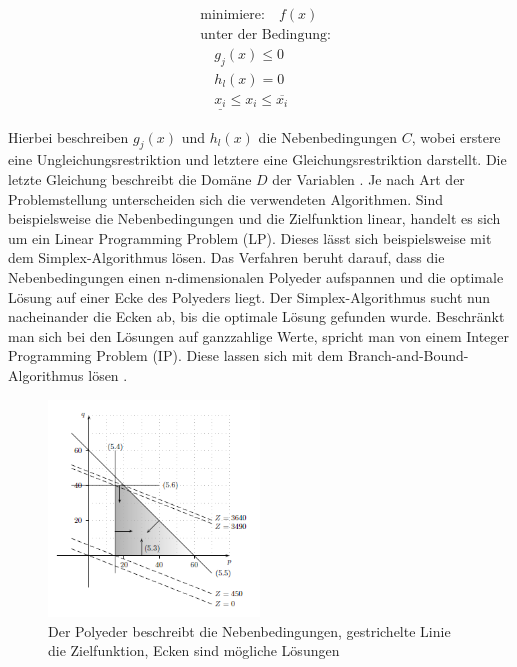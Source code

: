 \[
\begin{aligned}
    &\text{minimiere:} \quad f(x) \\
    &\text{unter der Bedingung:} \\
    &\quad g_j(x) \leq 0 \\
    &\quad h_l(x) = 0 \\
    &\quad \underline{x_i} \leq x_i \leq \overline{x_i}
\end{aligned}
\]

Hierbei beschreiben \(g_j(x)\) und \(h_l(x)\) die Nebenbedingungen \(C\), wobei
erstere eine Ungleichungsrestriktion und letztere eine Gleichungsrestriktion
darstellt. Die letzte Gleichung beschreibt die Domäne \(D\) der Variablen
\cite[154]{marti21bo}. Je nach Art der Problemstellung unterscheiden sich die
verwendeten Algorithmen. Sind beispielsweise die Nebenbedingungen und die
Zielfunktion linear, handelt es sich um ein Linear Programming Problem (LP).
Dieses lässt sich beispielsweise mit dem Simplex-Algorithmus lösen. Das
Verfahren beruht darauf, dass die Nebenbedingungen einen n-dimensionalen
Polyeder aufspannen und die optimale Lösung auf einer Ecke des Polyeders liegt.
Der Simplex-Algorithmus sucht nun nacheinander die Ecken ab, bis die optimale
Lösung gefunden wurde. Beschränkt man sich bei den Lösungen auf ganzzahlige
Werte, spricht man von einem Integer Programming Problem (IP). Diese lassen sich
mit dem Branch-and-Bound-Algorithmus lösen \cite{dakin65jo}
\cite[99]{hofst07bo}.

\begin{figure}[h]
    \centering
    \includegraphics[width=0.5\textwidth]{figures/Simplex.PNG}
    \caption{Der Polyeder beschreibt die Nebenbedingungen, gestrichelte Linie
    die Zielfunktion, Ecken sind mögliche Lösungen \cite[100]{hofst07bo}}
    \label{fig:Simplex}
\end{figure}

